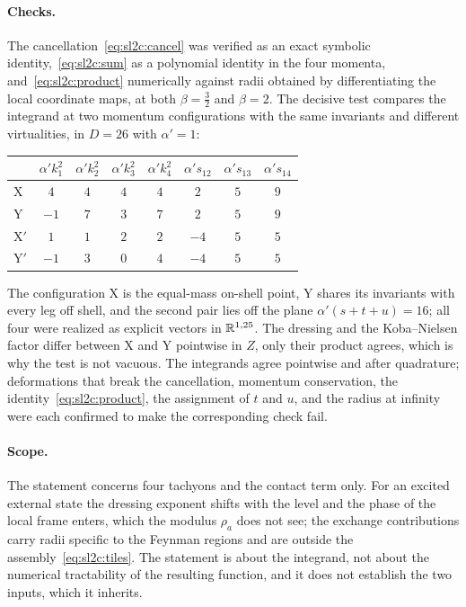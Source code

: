 \paragraph{Checks.}
The cancellation~\eqref{eq:sl2c:cancel} was verified as an exact symbolic identity,~\eqref{eq:sl2c:sum} as a polynomial identity in the four momenta, and~\eqref{eq:sl2c:product} numerically against radii obtained by differentiating the local coordinate maps, at both $\beta = \frac{3}{2}$ and $\beta = 2$.
The decisive test compares the integrand at two momentum configurations with the same invariants and different virtualities, in $D = 26$ with $\alpha' = 1$:
\begin{center}
  \small
  \begin{tabular}{lccccccc}
    \toprule
    & $\alpha' k_1^2$ & $\alpha' k_2^2$ & $\alpha' k_3^2$ & $\alpha' k_4^2$ & $\alpha' s_{12}$ & $\alpha' s_{13}$ & $\alpha' s_{14}$ \\
    \midrule
    X & $4$ & $4$ & $4$ & $4$ & $2$ & $5$ & $9$ \\
    Y & $-1$ & $7$ & $3$ & $7$ & $2$ & $5$ & $9$ \\
    X$'$ & $1$ & $1$ & $2$ & $2$ & $-4$ & $5$ & $5$ \\
    Y$'$ & $-1$ & $3$ & $0$ & $4$ & $-4$ & $5$ & $5$ \\
    \bottomrule
  \end{tabular}
\end{center}
The configuration X is the equal-mass on-shell point, Y shares its invariants with every leg off shell, and the second pair lies off the plane $\alpha' (s + t + u) = 16$; all four were realized as explicit vectors in $\mathbb{R}^{1,25}$.
The dressing and the Koba--Nielsen factor differ between X and Y pointwise in $Z$, only their product agrees, which is why the test is not vacuous.
The integrands agree pointwise and after quadrature; deformations that break the cancellation, momentum conservation, the identity~\eqref{eq:sl2c:product}, the assignment of $t$ and $u$, and the radius at infinity were each confirmed to make the corresponding check fail.

\paragraph{Scope.}
The statement concerns four tachyons and the contact term only.
For an excited external state the dressing exponent shifts with the level and the phase of the local frame enters, which the modulus $\rho_a$ does not see; the exchange contributions carry radii specific to the Feynman regions and are outside the assembly~\eqref{eq:sl2c:tiles}.
The statement is about the integrand, not about the numerical tractability of the resulting function, and it does not establish the two inputs, which it inherits.

